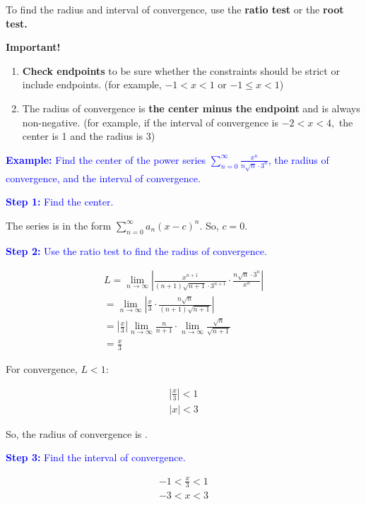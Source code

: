 \documentclass[letterpaper, 12pt]{article}
\newcommand{\example}[1]{\textcolor{blue}{\textbf{Example:} #1}}
\newcommand{\step}[2]{\textcolor{blue}{\textbf{Step #1:} #2}}
\begin{document}
To find the radius and interval of convergence, use the \textbf{ratio test} or the \textbf{root test.}

\textbf{Important!}

\begin{enumerate}
\item \textbf{Check endpoints} to be sure whether the constraints should be strict or include endpoints. (for example, $-1 < x < 1$ or $-1 \leq x < 1$)
\item The radius of convergence is \textbf{the center minus the endpoint} and is always non-negative. (for example, if the interval of convergence is $-2 < x < 4,$ the center is 1 and the radius is 3)
\end{enumerate}

\example{Find the center of the power series $\displaystyle \sum_{n=0}^\infty \frac{x^n}{n \sqrt{n} \cdot 3^n}$, the radius of convergence, and the interval of convergence.}

\step{1}{Find the center.}

The series is in the form $\displaystyle \sum_{n=0}^\infty a_n (x-c)^n.$ So, $\boxed{c = 0}.$

\step{2}{Use the ratio test to find the radius of convergence.}

\begin{gather*}
L = \lim_{n \to \infty} \left| \frac{x^{n+1}}{(n+1) \sqrt{n+1} \cdot 3^{n+1}} \cdot \frac{n \sqrt{n} \cdot 3^n}{x^n} \right| \\
= \lim_{n \to \infty} \left| \frac{x}{3} \cdot \frac{n \sqrt{n}}{(n+1) \sqrt{n+1}} \right| \\
= \left| \frac{x}{3} \right| \lim_{n \to \infty} \frac{n}{n+1} \cdot \lim_{n \to \infty} \frac{\sqrt{n}}{\sqrt{n+1}} \\
= \frac{x}{3}
\end{gather*}

For convergence, $L < 1$:

\begin{gather*}
\left| \frac{x}{3} \right| < 1 \\
|x| < 3
\end{gather*}

So, the radius of convergence is .

\step{3}{Find the interval of convergence.}

\begin{gather*}
-1 < \frac{x}{3} < 1 \\
\boxed{-3 < x < 3}
\end{gather*}
\end{document}
